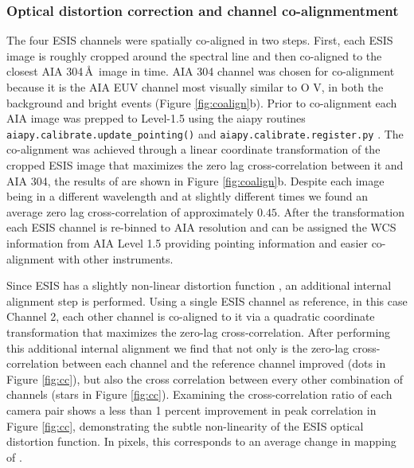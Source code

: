   \subsubsection{Optical distortion correction and channel co-alignmentment}
   		
   		The four ESIS channels were spatially co-aligned in two steps.  
   		First, each ESIS image is roughly cropped around the \ov spectral line and then co-aligned to the closest AIA 304\,\AA\ image in time.  AIA 304 channel was chosen for co-alignment because it is the AIA EUV channel most visually similar to O V, in both the background and bright events (Figure \ref{fig:coalign}b).
   		Prior to co-alignment each AIA image was prepped to Level-1.5 using the aiapy routines \texttt{aiapy.calibrate.update\_pointing()} and \texttt{aiapy.calibrate.register.py}  \citep{aiapy}.
   		The co-alignment was achieved through a linear coordinate transformation of the cropped ESIS image that maximizes the zero lag cross-correlation between it and AIA 304, the results of are shown in Figure \ref{fig:coalign}b.
   		Despite each image being in a different wavelength and at slightly different times we found an average zero lag cross-correlation of approximately $0.45$.
   		After the transformation each ESIS channel is re-binned to AIA resolution and can be assigned the WCS  information from AIA Level 1.5 providing pointing information and easier co-alignment with other instruments.
   		
   		
   		
    	Since ESIS has a slightly non-linear distortion function \citep{ESIS}, an additional internal alignment step is performed.
    	Using a single ESIS channel as reference, in this case Channel 2, each other channel is co-aligned to it via a quadratic coordinate transformation that maximizes the zero-lag cross-correlation. 
    	After performing this additional internal alignment we find that not only is the zero-lag cross-correlation between each channel and the reference channel improved (dots in Figure \ref{fig:cc}), but also the cross correlation between every other combination of channels (stars in Figure \ref{fig:cc}).
    	Examining the cross-correlation ratio of each camera pair shows a less than 1 percent improvement in peak correlation in Figure \ref{fig:cc}, demonstrating the subtle non-linearity of the ESIS optical distortion function.
    	In pixels, this corresponds to an average change in mapping of .
    	
